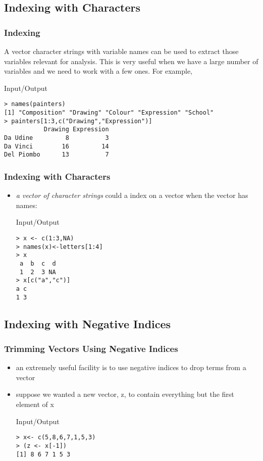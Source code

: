\documentclass[xcolor={table},c]{beamer}
\begin{document}
\subsection{Indexing with Characters}
\begin{frame}[fragile]\frametitle{Indexing}
A vector character strings with variable names can be used to extract those variables relevant for analysis. This is very useful when we have a large number of variables and we need to work with a few ones. For example,
\begin{exampleblock}{Input/Output}\small
\begin{verbatim}
> names(painters)
[1] "Composition" "Drawing" "Colour" "Expression" "School"
> painters[1:3,c("Drawing","Expression")]
           Drawing Expression
Da Udine         8          3
Da Vinci        16         14
Del Piombo      13          7
\end{verbatim}
\end{exampleblock}
\end{frame}



\begin{frame}[fragile]\frametitle{Indexing with Characters} %
\begin{itemize}
\item \emph{a vector of character strings} could a index on a vector when the vector has names:
  \begin{exampleblock}{Input/Output}
\begin{verbatim}
> x <- c(1:3,NA)
> names(x)<-letters[1:4]
> x
 a  b  c  d
 1  2  3 NA
> x[c("a","c")]
a c
1 3
\end{verbatim}
  \end{exampleblock}
\end{itemize}
\end{frame}

\subsection{Indexing with Negative Indices}
\begin{frame}[fragile]\frametitle{Trimming Vectors Using Negative Indices} %
\begin{itemize}
\item an extremely useful facility is to use negative indices to drop terms from a vector
\item suppose we wanted a new vector, z, to contain everything but the first element of x
  \begin{exampleblock}{Input/Output}
\begin{verbatim} 
> x<- c(5,8,6,7,1,5,3)
> (z <- x[-1])
[1] 8 6 7 1 5 3
\end{verbatim}
  \end{exampleblock}
\end{itemize}
\end{frame}
\end{document}
